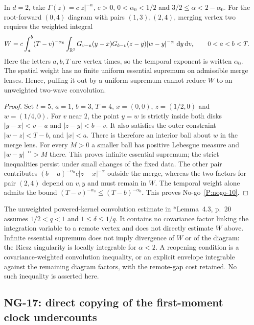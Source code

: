 \setcounter{nogo}{9}
\begin{nogo}
  \label{P:nogo-10}
  In $d=2$, take $\Gamma(z)=c|z|^{-\alpha}$, $c>0$,
  $0<\alpha_0<1/2$ and $3/2\le\alpha<2-\alpha_0$.
  For the root-forward $(0,4)$ diagram
  with pairs $(1,3),(2,4)$, merging vertex two requires the weighted integral
  \[
    W=c\int_a^b(T-v)^{-\alpha_0}
    \int_{\mathbb R^2}G_{v-a}(y-x)G_{b-v}(z-y)|w-y|^{-\alpha}
    \,\,\mathrm{d} y\,\mathrm{d} v,
    \qquad 0<a<b<T.
  \]
  Here the letters $a,b,T$ are vertex times, so the temporal exponent is
  written $\alpha_0$. The spatial weight has no finite uniform essential
  supremum on admissible merge lenses. Hence, pulling it out by a uniform
  supremum cannot reduce $W$ to an unweighted two-wave convolution.
\end{nogo}
\begin{proof}
  Set $t=5$, $a=1$, $b=3$, $T=4$, $x=(0,0)$,
  $z=(1/2,0)$ and $w=(1/4,0)$. For $v$ near $2$, the point $y=w$
  is strictly inside both disks $|y-x|<v-a$ and $|z-y|<b-v$.
  It also satisfies the outer constraint $|w-z|<T-b$, and $|x|<a$.
  There is therefore an interior ball about $w$ in the merge lens.
  For every $M>0$ a smaller ball has positive Lebesgue measure and
  $|w-y|^{-\alpha}>M$ there. This proves infinite essential supremum;
  the strict inequalities persist under small changes of the fixed data.
  The other pair contributes $(b-a)^{-\alpha_0}c|z-x|^{-\alpha}$ outside
  the merge, whereas the two factors for pair $(2,4)$ depend on $v,y$
  and must remain in $W$. The temporal weight alone admits the bound
  $(T-v)^{-\alpha_0}\le(T-b)^{-\alpha_0}$.
  This proves No-go~\ref{P:nogo-10}.
\end{proof}

The unweighted powered-kernel convolution estimate in
\cite{bolanos-guerrero.nualart.ea:21:averaging}*{Lemma~4.3, p.~20}
assumes $1/2<q<1$ and $1\le\delta\le1/q$. It contains no covariance factor
linking the integration variable to a remote vertex and does not directly
estimate $W$ above. Infinite essential supremum does not imply divergence of $W$ or
of the diagram: the Riesz singularity is locally integrable for $\alpha<2$.
A reopening condition is a covariance-weighted convolution inequality,
or an explicit envelope integrable against the remaining diagram factors,
with the remote-gap cost retained. No such inequality is asserted here.

\subsection{NG-17: direct copying of the first-moment clock undercounts}
\label{S:nogo-17}

